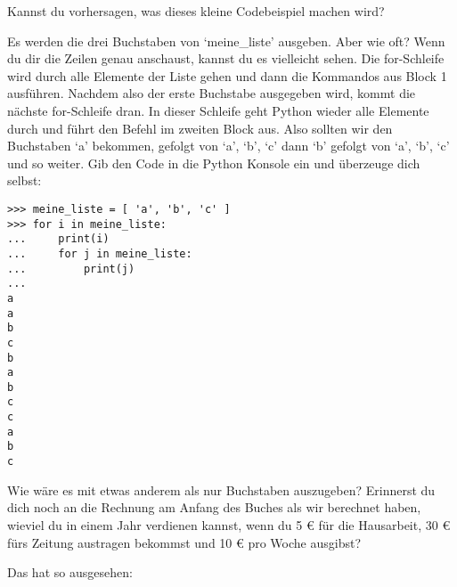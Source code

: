 Kannst du vorhersagen, was dieses kleine Codebeispiel machen wird?
\par
Es werden die drei Buchstaben von `meine\_liste' ausgeben. Aber wie oft? Wenn du dir die Zeilen genau anschaust, kannst du es vielleicht sehen. Die for-Schleife wird durch alle Elemente der Liste gehen und dann die Kommandos aus Block 1 ausführen. Nachdem also der erste Buchstabe ausgegeben wird, kommt die nächste for-Schleife dran. In dieser Schleife geht Python wieder alle Elemente durch und führt den Befehl im zweiten Block aus. Also sollten wir den Buchstaben `a' bekommen, gefolgt von `a', `b', `c' dann `b' gefolgt von `a', `b', `c' und so weiter. Gib den Code in die Python Konsole ein und überzeuge dich selbst:

\begin{Verbatim}[frame=single]
>>> meine_liste = [ 'a', 'b', 'c' ]
>>> for i in meine_liste:
...     print(i)
...     for j in meine_liste:
...         print(j)
...
a
a
b
c
b
a
b
c
c
a
b
c
\end{Verbatim}


Wie wäre es mit etwas anderem als nur Buchstaben auszugeben? Erinnerst du dich noch an die Rechnung am Anfang des Buches als wir berechnet haben, wieviel du in einem Jahr verdienen kannst, wenn du 5 € für die Hausarbeit, 30 € fürs Zeitung austragen bekommst und 10 € pro Woche ausgibst?
\par
\noindent
Das hat so ausgesehen:


